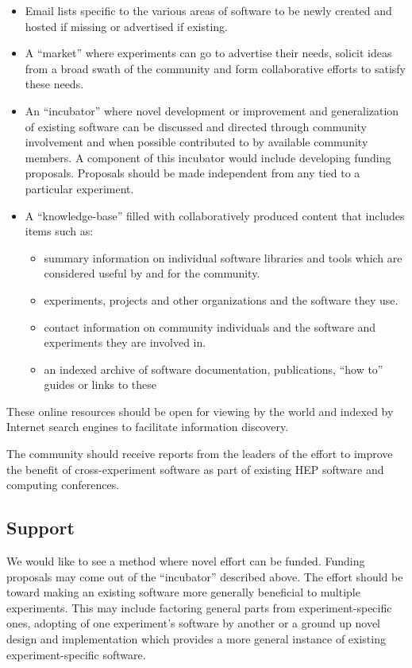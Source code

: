 \begin{itemize}
\item Email lists specific to the various areas of software to be
  newly created and hosted if missing or advertised if existing.
\item A ``market'' where experiments can go to advertise their needs,
  solicit ideas from a broad swath of the community and form
  collaborative efforts to satisfy these needs.
\item An ``incubator'' where novel development or improvement and
  generalization of existing software can be discussed and directed
  through community involvement and when possible contributed to by
  available community members.  A component of this incubator would
  include developing funding proposals.  Proposals should be made
  independent from any tied to a particular experiment.
\item A ``knowledge-base'' filled with collaboratively produced content
  that includes items such as:
  \begin{itemize}
  \item summary information on individual software libraries and tools
    which are considered useful by and for the community.
  \item experiments, projects and other organizations and the software they use.
  \item contact information on community individuals and the software
    and experiments they are involved in.
  \item an indexed archive of software documentation, publications,
    ``how to'' guides or links to these
  \end{itemize}
\end{itemize}

\noindent These online resources should be open for viewing by the world and
indexed by Internet search engines to facilitate information
discovery.

The community should receive reports from the leaders of the effort to
improve the benefit of cross-experiment software as part of existing
HEP software and computing conferences.


\subsection{Support}

We would like to see a method where novel effort can be funded.
Funding proposals may come out of the ``incubator'' described above.
The effort should be toward making an existing software more generally
beneficial to multiple experiments.  This may include factoring
general parts from experiment-specific ones, adopting of one
experiment's software by another or a ground up novel design and
implementation which provides a more general instance of existing
experiment-specific software.

